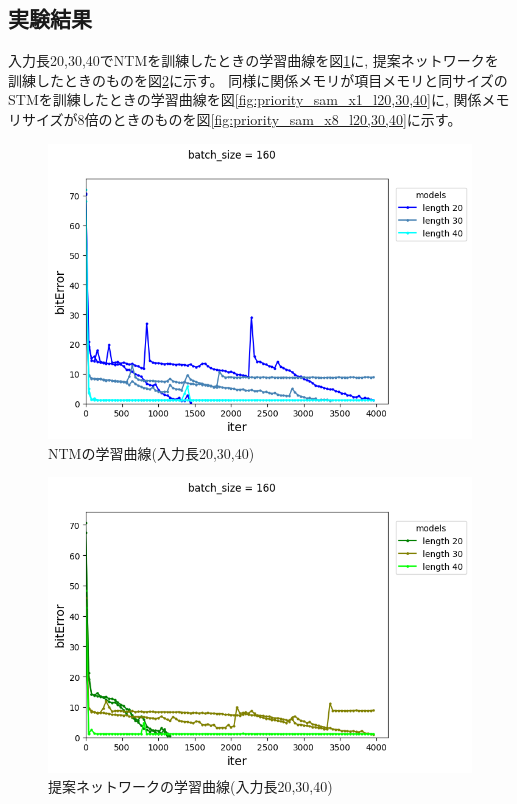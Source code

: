 \subsection{実験結果}
入力長20,30,40でNTMを訓練したときの学習曲線を図\ref{fig:priority_ntm_m20_l20,30,40}に,
提案ネットワークを訓練したときのものを図\ref{fig:priority_rrnn_m20_l20,30,40}に示す。
同様に関係メモリが項目メモリと同サイズのSTMを訓練したときの学習曲線を図\ref{fig:priority_sam_x1_l20,30,40}に,
関係メモリサイズが8倍のときのものを図\ref{fig:priority_sam_x8_l20,30,40}に示す。
\begin{figure}[t]
	\centering
	\includegraphics[width=\linewidth]{./figure/priority/ntm_m20_l20,30,40.png}
	\caption{NTMの学習曲線(入力長20,30,40)}
	\label{fig:priority_ntm_m20_l20,30,40}
\end{figure}
\begin{figure}[t]
	\centering
	\includegraphics[width=\linewidth]{./figure/priority/rrnn_m20_l20,30,40.png}
	\caption{提案ネットワークの学習曲線(入力長20,30,40)}
	\label{fig:priority_rrnn_m20_l20,30,40}
\end{figure}
